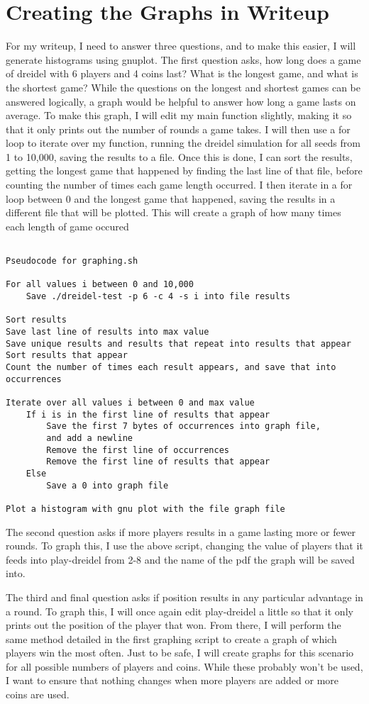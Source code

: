 \documentclass[11pt]{article}
\begin{document}
 \section{Creating the Graphs in Writeup}

 For my writeup, I need to answer three questions, and to make this easier, I will generate histograms using gnuplot. The first question asks, how long does a game of dreidel with 6 players and 4 coins last? What is the longest game, and what is the shortest game? While the questions on the longest and shortest games can be answered logically, a graph would be helpful to answer how long a game lasts on average. To make this graph, I will edit my main function slightly, making it so that it only prints out the number of rounds a game takes. I will then use a for loop to iterate over my function, running the dreidel simulation for all seeds from 1 to 10,000, saving the results to a file. Once this is done, I can sort the results, getting the longest game that happened by finding the last line of that file, before counting the number of times each game length occurred. I then iterate in a for loop between 0 and the longest game that happened, saving the results in a different file that will be plotted. This will create a graph of how many times each length of game occured

\begin{verbatim}

Pseudocode for graphing.sh

For all values i between 0 and 10,000
    Save ./dreidel-test -p 6 -c 4 -s i into file results

Sort results
Save last line of results into max value
Save unique results and results that repeat into results that appear
Sort results that appear
Count the number of times each result appears, and save that into occurrences

Iterate over all values i between 0 and max value
    If i is in the first line of results that appear
        Save the first 7 bytes of occurrences into graph file,
        and add a newline
        Remove the first line of occurrences
        Remove the first line of results that appear
    Else
        Save a 0 into graph file

Plot a histogram with gnu plot with the file graph file

\end{verbatim}

 The second question asks if more players results in a game lasting more or fewer rounds. To graph this, I use the above script, changing the value of players that it feeds into play-dreidel from 2-8 and the name of the pdf the graph will be saved into.

 The third and final question asks if position results in any particular advantage in a round. To graph this, I will once again edit play-dreidel a little so that it only prints out the position of the player that won. From there, I will perform the same method detailed in the first graphing script to create a graph of which players win the most often. Just to be safe, I will create graphs for this scenario for all possible numbers of players and coins. While these probably won't be used, I want to ensure that nothing changes when more players are added or more coins are used. 
\end{document}
